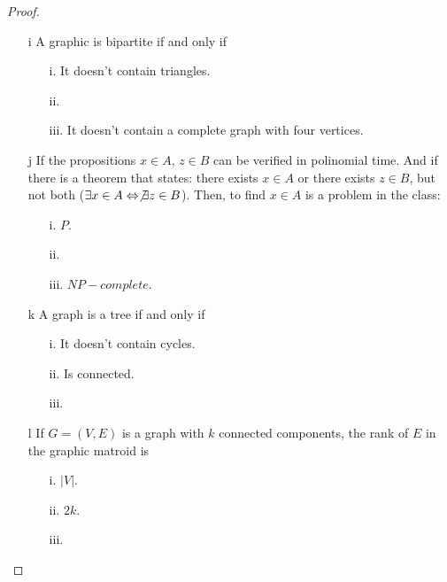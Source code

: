 \begin{proof}
\begin{itemize}
        \item[i] A graphic is bipartite if and only if
                    \begin{itemize}
                        \item[i.] It doesn't contain triangles.
                        \item[ii.] 
                        \item[iii.] It doesn't contain a complete graph with four vertices.
                    \end{itemize}

        \item[j] If the propositions $x \in A$, $z \in B$ can be verified in polinomial time.
                 And if there is a theorem that states: there exists $x \in A$ or there exists
                 $z \in B$, but not both ($\exists x \in A \Leftrightarrow \not\exists z \in B$).
                Then, to find $x \in A$ is a problem in the class:
                    \begin{itemize}
                        \item[i.] $P$.
                        \item[ii.]  
                        \item[iii.] $NP-complete$.
                    \end{itemize}

        \item[k] A graph is a tree if and only if
                    \begin{itemize}
                        \item[i.] It doesn't contain cycles.
                        \item[ii.] Is connected.
                        \item[iii.] 
                    \end{itemize}

        \item[l] If $G = (V, E)$ is a graph with $k$ connected components, the rank of $E$ in the
                 graphic matroid is
                    \begin{itemize}
                        \item[i.] $|V|$.
                        \item[ii.] $2k$.
                        \item[iii.] 
                    \end{itemize}


\end{itemize}
\end{proof}
